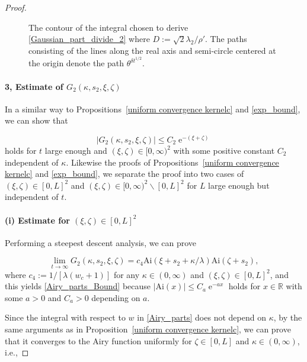 \documentclass[cmp]{svjour}
\numberwithin{theorem}{section}
\numberwithin{equation}{section}
\DeclareMathOperator{\e}{e}
\begin{document}
\begin{proof}
\begin{figure}[h]
\begin{center}
\begin{tikzpicture}[scale=2.5]
\end{tikzpicture}
\end{center}
\caption{The contour of the integral chosen to derive \eqref{Gaussian_part_divide_2} where $D := \sqrt{2} \lambda_2 / \rho'$. The paths consisting of the lines along the real axis and semi-circle centered at the origin denote the path $\theta^{\delta t^{1/2}}$.}
\label{fig:contour gaussian pv}
\end{figure}

\paragraph{3, Estimate of $G_2(\kappa, s_2, \xi , \zeta)$}

In a similar way to Propositions~\ref{uniform convergence kernelc} and \ref{exp_bound},  we can show that

\begin{equation}
\label{Airy_parts_Bound}
\left| G_2(\kappa, s_2 , \xi , \zeta) \right| \leq C_2 \e^{-(\xi + \zeta)}
\end{equation}
holds for $t$ large enough and $(\xi, \zeta) \in [0, \infty )^2$ with some positive constant $C_2$ independent of $\kappa$.
Likewise the proofs of Propositions~\ref{uniform convergence kernelc} and \ref{exp_bound}, we separate the proof into two cases of $(\xi, \zeta) \in [0,L]^2$ and $ (\xi, \zeta) \in [0, \infty)^2 \backslash [0,L]^2$ for $L$ large enough but independent of $t$.

\paragraph{(i) Estimate for $(\xi , \zeta) \in [0,L]^2$}

Performing a steepest descent analysis, we can prove

\begin{equation}
\label{Airy_parts_limit}
 \lim_{t \to \infty}G_2(\kappa, s_2 , \xi , \zeta) = c_4 \mathrm{Ai}(\xi + s_2 + \kappa/\lambda) \mathrm{Ai}(\zeta + s_2) ,
\end{equation}
where $c_4 := 1/[\lambda (w_c + 1)]$ for any $\kappa \in (0, \infty)$ and $(\xi, \zeta) \in [0,L]^2$, and this yields \eqref{Airy_parts_Bound} because $|\mathrm{Ai}(x)|\leq C_a \e^{-a x}$ holds for $x \in \mathbb{R}$ with some $a > 0$ and $C_a >0$ depending on $a$.

Since the integral with respect to $w$ in \eqref{Airy_parts} does not depend on $\kappa$, by the same arguments as in Proposition~\ref{uniform convergence kernelc}, we can prove that it converges to the Airy function uniformly for $\zeta \in [0,L]$ and $\kappa \in (0, \infty)$, i.e.,


\end{proof}
\end{document}
